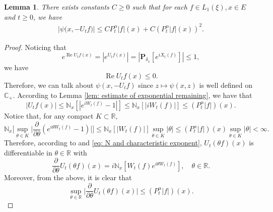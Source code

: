 \documentclass[12pt,a4paper]{amsart}
\theoremstyle{plain}
\newtheorem{lem}[thm]{Lemma}
\theoremstyle{definition}
\numberwithin{equation}{section}
\begin{document}
\begin{lem}
    There exists constants $C\geq 0$ such that for each $f \in L_1(\xi),x\in E$ and $t\geq 0$, we have
\begin{equation}\begin{split}
\label{eq: upper bound of psi(v)}
    \big|\psi\big(x,-U_tf\big)\big|
    \leq C P^\alpha_t |f|(x)+
     C (P^\alpha_t |f| (x))^2.
\end{split}\end{equation}
\end{lem}
\begin{proof}
     Noticing that
\[
     e^{\operatorname{Re} U_tf(x)}
    = |e^{U_tf(x)}|
    = |\mathbf P_{\delta_x}[e^{i X_t(f)}]|
    \leq 1,
\]
    we have
\begin{equation}
\label{eq: -v has positive real part}
 \operatorname{Re} U_tf(x)
    \leq 0.
\end{equation}
    Therefore, we can talk about $\psi(x,-U_tf)$ since $z\mapsto \psi(x,z)$ is well defined on $\mathbb C_+$.
    According to Lemma \ref{lem: estimate of exponential remaining}, we have that
\begin{equation}
\label{eq: upper bound for vf}
    |U_tf(x)| \leq \mathbb N_x[|e^{i W_t(f)} - 1|]
    \leq \mathbb N_x[|i W_t(f)|]
  \leq (P^\alpha_t |f|)(x).
\end{equation}
    Notice that, for any compact $K \subset \mathbb R$,
\begin{equation}
\label{eq: estimate of deriavetive of v(theta)}
    \mathbb N_x\Big[\sup_{\theta \in K} \Big|\frac{\partial}{\partial \theta} (e^{i\theta W_t(f)} - 1) \Big|\Big]
    \leq \mathbb N_x[|W_t(f)|] \sup_{\theta \in K}|\theta| 
    \leq (P^\alpha_t |f|)(x) \sup_{\theta \in K}|\theta| < \infty.
\end{equation}
    Therefore, according to \cite[Theorem A.5.2.]{Durrett2010Probability} and \eqref{eq: N and characteristic exponent},
    $U_t(\theta f)(x)$ is differentiable in $\theta \in \mathbb R$ with
\[
    \frac{\partial}{\partial \theta} U_t(\theta f)(x)
    = i\mathbb N_x[W_t(f)e^{i\theta W_t(f)}],
    \quad \theta \in \mathbb R.
\]
    Moreover, from the above, it is clear that
\begin{equation}
\label{eq: upper bounded for derivative of v(theta)}
    \sup_{\theta \in \mathbb R}\Big| \frac{\partial}{\partial \theta}U_t(\theta f)(x)\Big|
    \leq ( P^\alpha_t |f|)(x).

\end{equation}
\end{proof}
\end{document}
